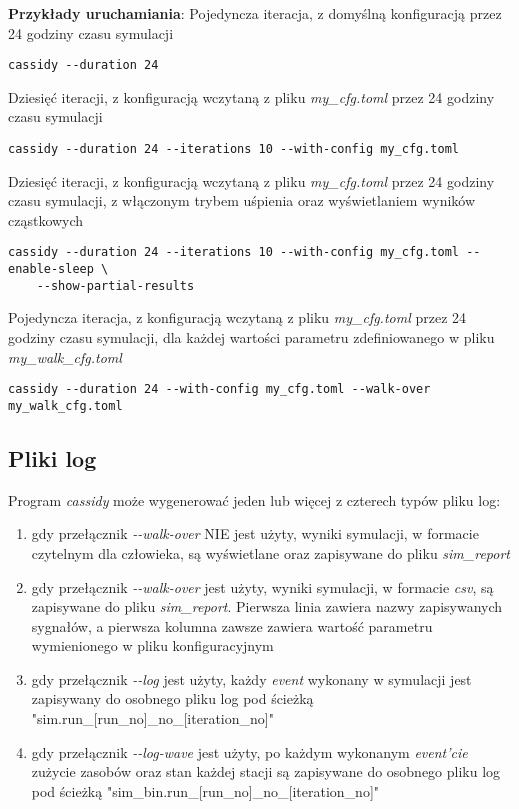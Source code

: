 \noindent \textbf{Przykłady uruchamiania}:
\newline\newline
Pojedyncza iteracja, z domyślną konfiguracją przez 24 godziny czasu symulacji

{
\selectfont 
\begin{verbatim}
cassidy --duration 24
\end{verbatim}
}

\noindent Dziesięć iteracji, z konfiguracją wczytaną z pliku \emph{my\_cfg.toml} przez 24 godziny czasu symulacji

{
\selectfont 
\begin{verbatim}
cassidy --duration 24 --iterations 10 --with-config my_cfg.toml
\end{verbatim}
}

\noindent Dziesięć iteracji, z konfiguracją wczytaną z pliku \emph{my\_cfg.toml} przez 24 godziny czasu symulacji, z włączonym trybem uśpienia oraz wyświetlaniem wyników cząstkowych

{
\selectfont 
\begin{verbatim}
cassidy --duration 24 --iterations 10 --with-config my_cfg.toml --enable-sleep \
	--show-partial-results
\end{verbatim}
}

\noindent Pojedyncza iteracja, z konfiguracją wczytaną z pliku \emph{my\_cfg.toml} przez 24 godziny czasu symulacji, dla każdej wartości parametru zdefiniowanego w pliku \emph{my\_walk\_cfg.toml}

{
\selectfont 
\begin{verbatim}
cassidy --duration 24 --with-config my_cfg.toml --walk-over my_walk_cfg.toml
\end{verbatim}
}

\subsection{Pliki log}
Program \emph{cassidy} może wygenerować jeden lub więcej z czterech typów pliku log:
\begin{enumerate}
\item gdy przełącznik \emph{-{}-walk-over} NIE jest użyty, wyniki symulacji, w formacie czytelnym dla człowieka, są wyświetlane oraz zapisywane do pliku \emph{sim\_report}
\item gdy przełącznik \emph{-{}-walk-over} jest użyty, wyniki symulacji, w formacie \emph{csv}, są zapisywane do pliku \emph{sim\_report}. Pierwsza linia zawiera nazwy zapisywanych sygnałów, a pierwsza kolumna zawsze zawiera wartość parametru wymienionego w pliku konfiguracyjnym
\item gdy przełącznik \emph{-{}-log} jest użyty, każdy \emph{event} wykonany w symulacji jest zapisywany do osobnego pliku log pod ścieżką "sim.run\_[run\_no]\_no\_[iteration\_no]"
\item gdy przełącznik \emph{-{}-log-wave} jest użyty, po każdym wykonanym \emph{event'cie} zużycie zasobów oraz stan każdej stacji są zapisywane do osobnego pliku log pod ścieżką "sim\_bin.run\_[run\_no]\_no\_[iteration\_no]"
\end{enumerate}

